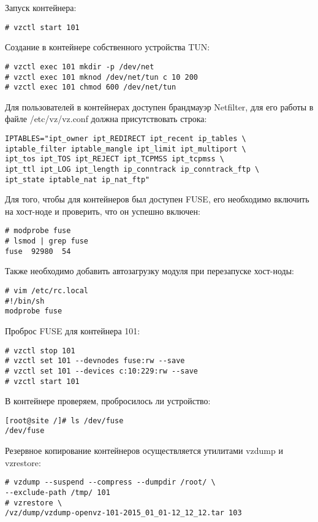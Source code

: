 Запуск контейнера:
\begin{lstlisting}
# vzctl start 101
\end{lstlisting}

Создание в контейнере собственного устройства TUN:
\begin{lstlisting}
# vzctl exec 101 mkdir -p /dev/net
# vzctl exec 101 mknod /dev/net/tun c 10 200
# vzctl exec 101 chmod 600 /dev/net/tun
\end{lstlisting}

Для пользователей в контейнерах доступен брандмауэр Netfilter, для его работы в файле /etc/vz/vz.conf должна присутствовать строка:
\begin{lstlisting}
IPTABLES="ipt_owner ipt_REDIRECT ipt_recent ip_tables \
iptable_filter iptable_mangle ipt_limit ipt_multiport \
ipt_tos ipt_TOS ipt_REJECT ipt_TCPMSS ipt_tcpmss \
ipt_ttl ipt_LOG ipt_length ip_conntrack ip_conntrack_ftp \
ipt_state iptable_nat ip_nat_ftp"
\end{lstlisting}

Для того, чтобы для контейнеров был доступен FUSE, его необходимо включить на хост-ноде и проверить, что он успешно включен:
\begin{lstlisting}
# modprobe fuse
# lsmod | grep fuse
fuse  92980  54
\end{lstlisting}

Также необходимо добавить автозагрузку модуля при перезапуске хост-ноды:
\begin{lstlisting}
# vim /etc/rc.local
#!/bin/sh
modprobe fuse
\end{lstlisting}

Проброс FUSE для контейнера 101:
\begin{lstlisting}
# vzctl stop 101
# vzctl set 101 --devnodes fuse:rw --save
# vzctl set 101 --devices c:10:229:rw --save
# vzctl start 101
\end{lstlisting}

В контейнере проверяем, пробросилось ли устройство:
\begin{lstlisting}
[root@site /]# ls /dev/fuse
/dev/fuse
\end{lstlisting}

Резервное копирование контейнеров осуществляется утилитами vzdump и vzrestore:
\begin{lstlisting}
# vzdump --suspend --compress --dumpdir /root/ \
--exclude-path /tmp/ 101
# vzrestore \
/vz/dump/vzdump-openvz-101-2015_01_01-12_12_12.tar 103
\end{lstlisting}

